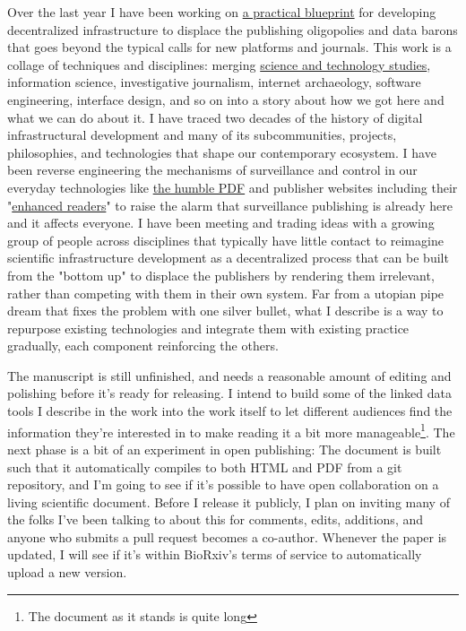 \begin{done}
Over the last year I have been working on \href{https://jon-e.net/infrastructure/}{a practical blueprint} for developing decentralized infrastructure to displace the publishing oligopolies and data barons that goes beyond the typical calls for new platforms and journals. This work is a collage of techniques and disciplines: merging \href{https://en.wikipedia.org/wiki/Science_and_technology_studies}{science and technology studies}, information science, investigative journalism, internet archaeology, software engineering, interface design, and so on into a story about how we got here and what we can do about it. I have traced two decades of the history of digital infrastructural development and many of its subcommunities, projects, philosophies, and technologies that shape our contemporary ecosystem. I have been reverse engineering the mechanisms of surveillance and control in our everyday technologies like \href{https://twitter.com/json_dirs/status/1486120144141123584}{the humble PDF}\cite{franceschi-bicchieraiAcademicJournalClaims2022} and publisher websites including their "\href{https://twitter.com/json_dirs/status/1466951017459716096}{enhanced readers}"\cite{deferCommentEditeursScientifiques2022} to raise the alarm that surveillance publishing is already here and it affects everyone. I have been meeting and trading ideas with a growing group of people across disciplines that typically have little contact to reimagine scientific infrastructure development as a decentralized process that can be built from the "bottom up" to displace the publishers by rendering them irrelevant, rather than competing with them in their own system. Far from a utopian pipe dream that fixes the problem with one silver bullet, what I describe is a way to repurpose existing technologies and integrate them with existing practice gradually, each component reinforcing the others. 
\end{done}

\begin{todo}
\label{todo:infrastructure}
The manuscript is still unfinished, and needs a reasonable amount of editing and polishing before it's ready for releasing. I intend to build some of the linked data tools I describe in the work into the work itself to let different audiences find the information they're interested in to make reading it a bit more manageable\footnote{The document as it stands is quite long}. The next phase is a bit of an experiment in open publishing: The document is built such that it automatically compiles to both HTML and PDF from a git repository, and I'm going to see if it's possible to have open collaboration on a living scientific document. Before I release it publicly, I plan on inviting many of the folks I've been talking to about this for comments, edits, additions, and anyone who submits a pull request becomes a co-author. Whenever the paper is updated, I will see if it's within BioRxiv's terms of service to automatically upload a new version.
\end{todo}
